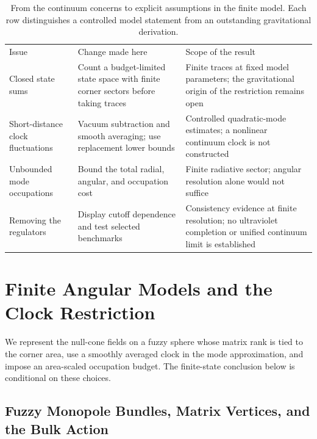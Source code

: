 \documentclass[onecolumn,11pt,aps,prd,amsmath,amssymb,nofootinbib,floatfix]{revtex4-2}
\begin{document}
\begin{table}[t]
\caption{From the continuum concerns to explicit assumptions in the finite model. Each row distinguishes a controlled model statement from an outstanding gravitational derivation.}
\label{tab:changes}
\begin{ruledtabular}
\begin{tabular}{p{}p{}p{}}
Issue & Change made here & Scope of the result \\
\colrule
Closed state sums & Count a budget-limited state space with finite corner sectors before taking traces & Finite traces at fixed model parameters; the gravitational origin of the restriction remains open \\
Short-distance clock fluctuations & Vacuum subtraction and smooth averaging; use replacement lower bounds & Controlled quadratic-mode estimates; a nonlinear continuum clock is not constructed \\
Unbounded mode occupations & Bound the total radial, angular, and occupation cost & Finite radiative sector; angular resolution alone would not suffice \\
Removing the regulators & Display cutoff dependence and test selected benchmarks & Consistency evidence at finite resolution; no ultraviolet completion or unified continuum limit is established \\
\end{tabular}
\end{ruledtabular}
\end{table}

\section{Finite Angular Models and the Clock Restriction}\label{sec:unified}

We represent the null-cone fields on a fuzzy sphere whose matrix rank is tied to the corner area, use a smoothly averaged clock in the mode approximation, and impose an area-scaled occupation budget. The finite-state conclusion below is conditional on these choices.

\subsection{Fuzzy Monopole Bundles, Matrix Vertices, and the Bulk Action}\label{sec:unified_action}
\end{document}
